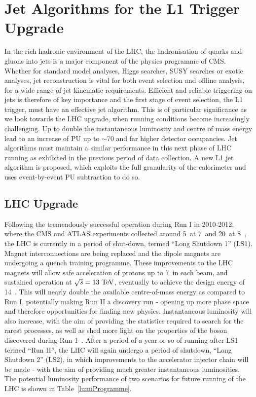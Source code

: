 \chapter{Jet Algorithms for the L1 Trigger Upgrade}
\label{chap:l1jets}

In the rich hadronic environment of the \ac{LHC}, the hadronisation of quarks and gluons into jets is a major component of the physics programme of \ac{CMS}. 
Whether for standard model analyses, Higgs searches, \ac{SUSY} searches or exotic analyses,
jet reconstruction is vital for both event selection and offline analysis, for a wide range of jet kinematic requirements.
Efficient and reliable triggering on jets is therefore of key importance
and the first stage of event selection, the \ac{L1} trigger, must have an effective jet algorithm.
This is of particular significance as we look towards the \ac{LHC} upgrade, when running conditions become increasingly challenging. 
Up to double the instantaneous luminosity and centre of mass energy lead to an increase of \ac{PU} up to $\sim 70$ and far higher detector occupancies.
Jet algorithms must maintain a similar performance in this next phase of \ac{LHC} running as exhibited in the previous period of data collection.
A new L1 jet algorithm is proposed, which exploits the full granularity of the calorimeter and uses event-by-event \ac{PU} subtraction to do so. 

\section{LHC Upgrade\label{sec:LHCupgrade}}

Following the tremendously successful operation during Run I in 2010-2012, where the \ac{CMS} and \ac{ATLAS}
experiments collected around 5~\fbinv at 7~\TeV and 20~\fbinv at 8~\TeV,
the \ac{LHC} is currently in a period of shut-down, termed ``Long Shutdown 1'' (LS1). 
Magnet interconnections are being replaced and the dipole magnets are undergoing a quench training programme. 
These improvements to the \ac{LHC} magnets will allow safe acceleration of protons up to 7~\TeV in each beam, and sustained operation at $\sqrt{s}=13~\mathrm{TeV}$, eventually to achieve the design energy of 14~\TeV.
This will nearly double the available centre-of-mass energy as compared to Run I, potentially making Run II a discovery run - opening up more phase space and therefore opportunities for finding new physics.
Instantaneous luminosity will also increase, with the aim of providing the statistics required to search for the rarest processes, as well as shed more light on the properties of the boson discovered during Run 1~\cite{Aad:2012tfa,Chatrchyan:2012ufa,HiggsEvidence}. 
After a period of a year or so of running after LS1 termed ``Run II'', the \ac{LHC} will again undergo a period of shutdown, 
``Long Shutdown 2'' (LS2), in which improvements to the accelerator injector chain will be made - with the aim of providing much greater instantaneous luminosities. 
The potential luminosity performance of two scenarios for future running of the \ac{LHC} is shown in Table~\ref{lumiProgramme}. 

